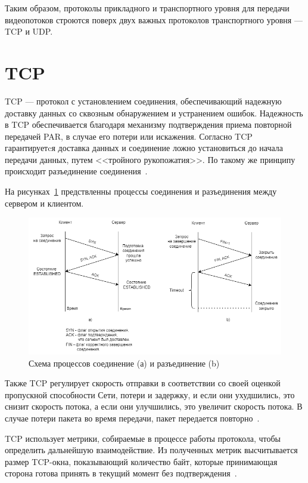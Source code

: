 Таким образом, протоколы прикладного и транспортного уровня для передачи видеопотоков строются поверх двух важных протоколов транспортного уровня --- TCP и UDP.

\section{TCP}

TCP --- протокол с установлением соединения, обеспечивающий надежную доставку данных со сквозным обнаружением и устранением ошибок.
Надежность в TCP обеспечивается благодаря механизму подтверждения приема повторной передачей PAR, в случае его потери или искажения. Согласно TCP гарантируетcя доставка данных и соединение ложно установиться до начала передачи данных, путем <<тройного рукопожатия>>. По такому же принципу происходит разъединение соединения~\cite{tcp_ip_reilly, tcp_ip_lora}. 

\clearpage

На рисунках~\ref{pr:conn_network} предствленны процессы соединения и разъединения между сервером и клиентом.

\begin{figure}[h]
	\centering
	\includegraphics[width=1\textwidth]{img/tcp_network.png}
	\caption{Схема процессов соединение (а) и разъединение (b)~\cite{tcp_ip_reilly}}
	\label{pr:conn_network}
\end{figure}

Также TCP регулирует скорость отправки в соответствии со своей оценкой пропускной способности Сети, потери и задержку, и если они ухудшились, это снизит скорость потока, а если они улучшились, это увеличит скорость потока. 
В случае потери пакета во время передачи, пакет передается  повторно~\cite{tcp_ip_reilly, tcp_ip_lora, protocls_lakin}. 

TCP использует метрики, собираемые в процессе работы протокола, чтобы определить дальнейшую взаимодействие. Из полученных метрик высчитывается размер TCP-окна, показывающий количество байт, которые принимающая сторона готова принять в текущий момент без подтверждения~\cite{tcp_ip_reilly}.

